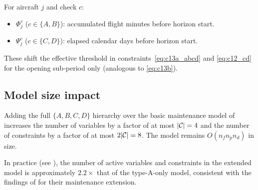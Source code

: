 For aircraft $j$ and check $c$:
\begin{itemize}
  \item $\Phi^c_j$ ($c \in \{A,B\}$): accumulated flight minutes before
    horizon start.
  \item $\Psi^c_j$ ($c \in \{C,D\}$): elapsed calendar days before horizon
    start.
\end{itemize}
These shift the effective threshold in constraints~\eqref{eq:c13a_abcd} and
\eqref{eq:c12_cd} for the opening sub-period only (analogous to
\eqref{eq:c13b}).

\subsection{Model size impact}

\begin{proposition}
  Adding the full $\{A,B,C,D\}$ hierarchy over the basic maintenance model of
   increases the number of variables by a factor of at
  most $|\mathcal{C}| = 4$ and the number of constraints by a factor of at most
  $2|\mathcal{C}| = 8$.  The model remains $O(n_f n_p n_d)$ in size.
\end{proposition}

In practice (see ), the number of active variables and
constraints in the extended model is approximately $2.2\times$ that of the
type-A-only model, consistent with the findings of \citet{khaled2018compact}
for their maintenance extension.
